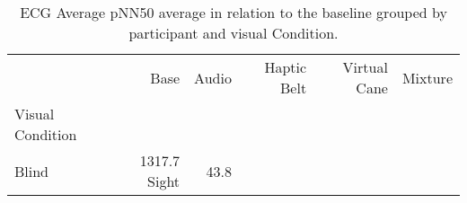 
\begin{table}[!htb]
\centering
\caption{ECG Average pNN50 average in relation to the baseline grouped by participant and visual Condition.}
\label{tab:ecg_pnn50_average_group}
\begin{tabular}{lrrrrr}
\toprule
{} &     Base &    Audio & Haptic Belt & Virtual Cane &  Mixture \\
Visual Condition &          &          &             &              &          \\
\midrule
Blind            &  1317.7%
Sight            &    43.8%
\bottomrule
\end{tabular}
\end{table}

